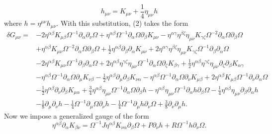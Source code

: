 \documentclass[10pt,letterpaper]{article}
\begin{document}
\begin{equation}
	h_{\mu\nu} = K_{\mu\nu} + \frac 14 \eta_{\mu\nu}h
\end{equation}
where $h = \eta^{\mu\nu}h_{\mu\nu}$. With this substitution, (2) takes the form
\begin{align}
\delta G_{\mu\nu}={}&-2 \eta^{\alpha \beta} K_{\mu \beta} \Omega^{-1} \partial_{\alpha}\partial_{\nu}\Omega
 + \eta^{\alpha \beta} \Omega^{-1} \partial_{\alpha}\Omega \partial_{\beta}K_{\mu \nu}
 -  \eta^{\alpha \gamma} \eta^{\beta \zeta} \eta_{\mu \nu} K_{\gamma \zeta} \Omega^{-2} \partial_{\alpha}\Omega \partial_{\beta}\Omega\nonumber\\
& + \eta^{\alpha \beta} K_{\mu \nu} \Omega^{-2} \partial_{\alpha}\Omega \partial_{\beta}\Omega
 + \tfrac{1}{2} \eta^{\alpha \beta} \partial_{\beta}\partial_{\alpha}K_{\mu \nu}
 + 2 \eta^{\alpha \gamma} \eta^{\beta \zeta} \eta_{\mu \nu} K_{\gamma \zeta} \Omega^{-1} \partial_{\beta}\partial_{\alpha}\Omega\nonumber\\
& - 2 \eta^{\alpha \beta} K_{\mu \nu} \Omega^{-1} \partial_{\beta}\partial_{\alpha}\Omega
 + 2 \eta^{\alpha \beta} \eta^{\gamma \zeta} \eta_{\mu \nu} \Omega^{-1} \partial_{\alpha}\Omega \partial_{\zeta}K_{\beta \gamma}
 + \tfrac{1}{2} \eta^{\alpha \beta} \eta^{\gamma \zeta} \eta_{\mu \nu} \partial_{\zeta}\partial_{\beta}K_{\alpha \gamma}\nonumber\\
& -  \eta^{\alpha \beta} \Omega^{-1} \partial_{\alpha}\Omega \partial_{\mu}K_{\nu \beta}
 -  \tfrac{1}{2} \eta^{\alpha \beta} \partial_{\mu}\partial_{\beta}K_{\nu \alpha}
 -  \eta^{\alpha \beta} \Omega^{-1} \partial_{\alpha}\Omega \partial_{\nu}K_{\mu \beta}
 + 2 \eta^{\alpha \beta} K_{\mu \beta} \Omega^{-1} \partial_{\nu}\partial_{\alpha}\Omega\nonumber\\
& -  \tfrac{1}{2} \eta^{\alpha \beta} \partial_{\nu}\partial_{\beta}K_{\mu \alpha}
+\tfrac{3}{4} \eta^{\alpha \beta} \eta_{\mu \nu} \Omega^{-1} \partial_{\alpha}\Omega \partial_{\beta}h
 -  \eta^{\alpha \beta} \eta_{\mu \nu} \Omega^{-1} \partial_{\alpha}h \partial_{\beta}\Omega
 -  \tfrac{1}{4} \eta^{\alpha \beta} \eta_{\mu \nu} \partial_{\beta}\partial_{\alpha}h\nonumber\\
 &-  \tfrac{1}{8} \partial_{\mu}\partial_{\nu}h
-  \tfrac{1}{4} \Omega^{-1} \partial_{\mu}\Omega \partial_{\nu}h
 -  \tfrac{1}{4} \Omega^{-1} \partial_{\mu}h \partial_{\nu}\Omega
 + \tfrac{3}{8} \partial_{\nu}\partial_{\mu}h.
\end{align}
Now we impose a generalized gauge of the form
\begin{equation}
	\eta^{\alpha\beta}\partial_{\alpha}K_{\beta\nu} = \Omega^{-1} J \eta^{\alpha\beta}K_{\nu\alpha}\partial_\beta \Omega + P \partial_\nu h + R \Omega^{-1} h \partial_\nu \Omega.
\end{equation}
\end{document}
